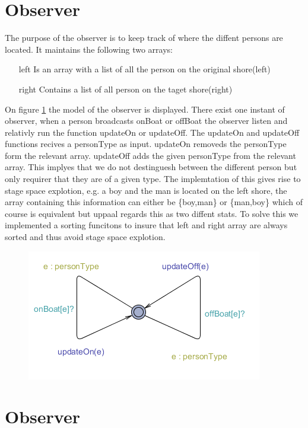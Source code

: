 \section{Observer}
The purpose of the observer is to keep track of where the diffent persons are located. It maintains the following two arrays:
\begin{itemize}
	\item[left] Is an array with a list of all the person on the original shore(left)
	\item[right] Contains a list of all person on the taget shore(right)
\end{itemize}

On figure \ref{fig:observer} the model of the observer is displayed. There exist one instant of observer, when a person broadcasts onBoat or offBoat the observer listen and relativly run the function updateOn or updateOff. 
The updateOn and updateOff functions recives a personType as input. updateOn removeds the personType form the relevant array. updateOff adds the given personType from the relevant array. This implyes that we do not destinguesh between the different person but only requirer that they are of a given type. The implemtation of this gives rise to stage space explotion, e.g. a boy and the man is located on the left shore, the array containing this information can either be \{boy,man\} or \{man,boy\} which of course is equivalent but uppaal regards this as two diffent stats. To solve this we implemented a sorting funcitons to insure that left and right array are always sorted and thus avoid stage space explotion.
  




\begin{figure}%
\includegraphics[width=\columnwidth]{pictures/observer.png}%
\caption{}%
\label{fig:observer}%
\end{figure}




























\section{Observer}